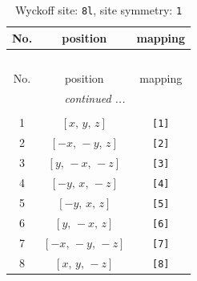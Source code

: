 \documentclass[fleqn,8pt]{jsarticle}
\begin{document}
\renewcommand{\arraystretch}{1.2}
\begin{longtable}{ccc}
\caption{Wyckoff site: {\tt 8l}, site symmetry: {\tt 1}}
 \\
 \hline \hline
No. & position & mapping \\ \hline \endfirsthead

\multicolumn{2}{l}{\tablename\ \thetable{}} \\
 \hline \hline
No. & position & mapping \\ \hline \endhead

 \hline \hline
\multicolumn{2}{r}{\footnotesize\it continued ...} \\ \endfoot

 \hline \hline
\multicolumn{2}{r}{} \\ \endlastfoot

1 & $\left[ x,\, y,\, z \right]$ & {\tt [1]} \\ \hline
2 & $\left[ - x,\, - y,\, z \right]$ & {\tt [2]} \\ \hline
3 & $\left[ y,\, - x,\, - z \right]$ & {\tt [3]} \\ \hline
4 & $\left[ - y,\, x,\, - z \right]$ & {\tt [4]} \\ \hline
5 & $\left[ - y,\, x,\, z \right]$ & {\tt [5]} \\ \hline
6 & $\left[ y,\, - x,\, z \right]$ & {\tt [6]} \\ \hline
7 & $\left[ - x,\, - y,\, - z \right]$ & {\tt [7]} \\ \hline
8 & $\left[ x,\, y,\, - z \right]$ & {\tt [8]} \\
\end{longtable}
\end{document}
